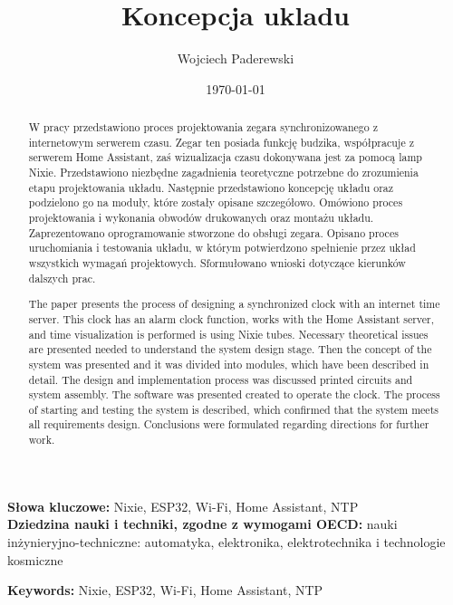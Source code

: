\documentclass[../main.tex]{subfiles}
\author{Wojciech Paderewski}
\date{\today}
\title{Koncepcja ukladu}
\begin{document}
\begin{abstract}
  W pracy przedstawiono proces projektowania zegara synchronizowanego
  z internetowym serwerem czasu. Zegar ten posiada funkcję budzika,
  współpracuje z serwerem Home Assistant, zaś wizualizacja czasu dokonywana
  jest za pomocą lamp Nixie. Przedstawiono niezbędne zagadnienia teoretyczne
  potrzebne do zrozumienia etapu projektowania układu. Następnie
  przedstawiono koncepcję układu oraz podzielono go na moduły, które
  zostały opisane szczegółowo. Omówiono proces projektowania i wykonania
  obwodów drukowanych oraz montażu układu. Zaprezentowano oprogramowanie
  stworzone do obsługi zegara. Opisano proces uruchomiania i testowania układu,
  w którym potwierdzono spełnienie przez układ wszystkich wymagań
  projektowych. Sformułowano wnioski dotyczące kierunków dalszych prac.  
\end{abstract}
\textbf{Słowa kluczowe:} Nixie, ESP32, Wi-Fi, Home Assistant, NTP \\
\textbf{Dziedzina nauki i techniki, zgodne z wymogami OECD:} nauki inżynieryjno-techniczne: automatyka, elektronika, elektrotechnika i technologie kosmiczne
\newpage
{}
\begin{abstract}
  The paper presents the process of designing a synchronized clock
  with an internet time server. This clock has an alarm clock function,
  works with the Home Assistant server, and time visualization is performed
  is using Nixie tubes. Necessary theoretical issues are presented
  needed to understand the system design stage. Then
  the concept of the system was presented and it was divided into modules, which
  have been described in detail. The design and implementation process was discussed
  printed circuits and system assembly. The software was presented
  created to operate the clock. The process of starting and testing the system is described,
  which confirmed that the system meets all requirements
  design. Conclusions were formulated regarding directions for further work.
\end{abstract}
\textbf{Keywords:} Nixie, ESP32, Wi-Fi, Home Assistant, NTP
\end{document}

